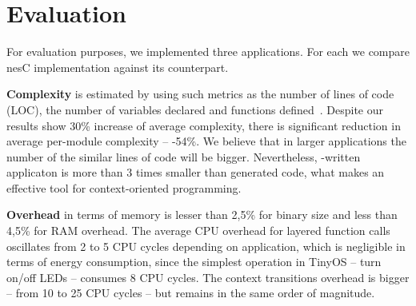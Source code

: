 \section{Evaluation}\label{sec:eval}

For evaluation purposes, we implemented three applications. For each we compare
nesC implementation against its \conesc counterpart.

{\bf Complexity} is estimated by using such metrics as the number of lines of
code (LOC), the number of variables declared and functions
defined~\cite{Pressman01}. Despite our results show 30\% increase of average
complexity, there is significant reduction in average per-module complexity --
-54\%. We believe that in larger applications the number of the similar lines of
code will be bigger. Nevertheless, \conesc-written applicaton is more than 3
times smaller than generated code, what makes \conesc an effective tool for
context-oriented programming.

{\bf Overhead} in terms of memory is lesser than
2,5\% for binary size and less than 4,5\% for RAM overhead. The average CPU
overhead for layered function calls oscillates from 2 to 5 CPU cycles depending
on application, which is negligible in terms of energy consumption, since the
simplest operation in TinyOS -- turn on/off LEDs -- consumes 8 CPU cycles. The
context transitions overhead is bigger -- from 10 to 25 CPU cycles -- but
remains in the same order of magnitude.
